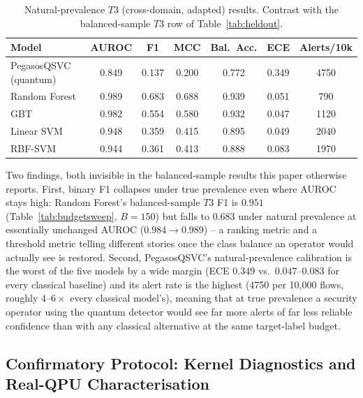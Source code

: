 \documentclass[conference]{IEEEtran}
\begin{document}
\begin{table}[t]
\centering
\caption{Natural-prevalence $T3$ (cross-domain, adapted) results. Contrast
with the balanced-sample $T3$ row of Table~\ref{tab:heldout}.}
\label{tab:naturalprev}
\renewcommand{\arraystretch}{1.1}
\begin{tabular}{@{}lcccccc@{}}
\toprule
\textbf{Model} & \textbf{AUROC} & \textbf{F1} & \textbf{MCC} & \textbf{Bal.\ Acc.} & \textbf{ECE} & \textbf{Alerts/10k} \\
\midrule
PegasosQSVC (quantum) & 0.849 & 0.137 & 0.200 & 0.772 & 0.349 & 4750 \\
Random Forest         & 0.989 & 0.683 & 0.688 & 0.939 & 0.051 & 790 \\
GBT                   & 0.982 & 0.554 & 0.580 & 0.932 & 0.047 & 1120 \\
Linear SVM            & 0.948 & 0.359 & 0.415 & 0.895 & 0.049 & 2040 \\
RBF-SVM               & 0.944 & 0.361 & 0.413 & 0.888 & 0.083 & 1970 \\
\bottomrule
\end{tabular}
\end{table}

Two findings, both invisible in the balanced-sample results this paper
otherwise reports. First, binary F1 collapses under true prevalence even
where AUROC stays high: Random Forest's balanced-sample $T3$ F1 is
$0.951$ (Table~\ref{tab:budgetsweep}, $B{=}150$) but falls to $0.683$
under natural prevalence at essentially unchanged AUROC ($0.984\to0.989$)
-- a ranking metric and a threshold metric telling different stories once
the class balance an operator would actually see is restored. Second,
PegasosQSVC's natural-prevalence calibration is the worst of the five
models by a wide margin (ECE $0.349$ vs.\ $0.047$--$0.083$ for every
classical baseline) and its alert rate is the highest (4750 per 10,000
flows, roughly $4$--$6\times$ every classical model's), meaning that at
true prevalence a security operator using the quantum detector would see
far more alerts of far less reliable confidence than with any classical
alternative at the same target-label budget.

\subsection{Confirmatory Protocol: Kernel Diagnostics and Real-QPU Characterisation}
\label{subsec:kerneldiag}
\end{document}
